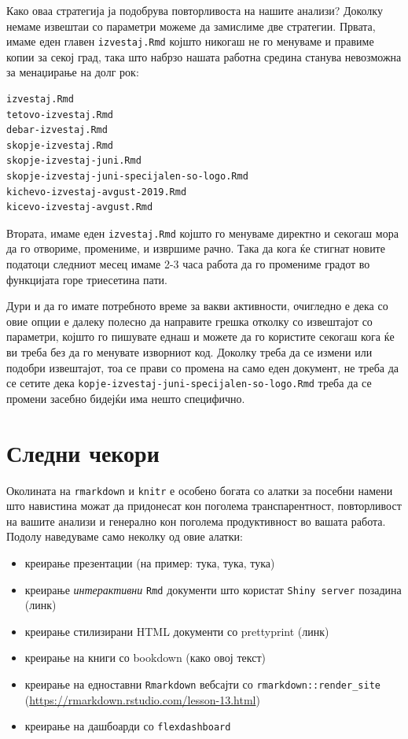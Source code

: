 \documentclass[
]{book}
\providecommand{\tightlist}{%
  \setlength{\itemsep}{0pt}\setlength{\parskip}{0pt}}
\begin{document}
Како оваа стратегија ја подобрува повторливоста на нашите анализи? Доколку немаме извештаи со параметри можеме да замислиме две стратегии. Првата, имаме еден главен \texttt{izvestaj.Rmd} којшто никогаш не го менуваме и правиме копии за секој град, така што набрзо нашата работна средина станува невозможна за менаџирање на долг рок:

\begin{verbatim}
izvestaj.Rmd
tetovo-izvestaj.Rmd
debar-izvestaj.Rmd
skopje-izvestaj.Rmd
skopje-izvestaj-juni.Rmd
skopje-izvestaj-juni-specijalen-so-logo.Rmd
kichevo-izvestaj-avgust-2019.Rmd
kicevo-izvestaj-avgust.Rmd
\end{verbatim}

Втората, имаме еден \texttt{izvestaj.Rmd} којшто го менуваме директно и секогаш мора да го отвориме, промениме, и извршиме рачно. Така да кога ќе стигнат новите податоци следниот месец имаме 2-3 часа работа да го промениме градот во функцијата горе триесетина пати.

Дури и да го имате потребното време за вакви активности, очигледно е дека со овие опции е далеку полесно да направите грешка отколку со извештајот со параметри, којшто го пишувате еднаш и можете да го користите секогаш кога ќе ви треба без да го менувате изворниот код. Доколку треба да се измени или подобри извештајот, тоа се прави со промена на само еден документ, не треба да се сетите дека \texttt{kopje-izvestaj-juni-specijalen-so-logo.Rmd} треба да се промени засебно бидејќи има нешто специфично.

\hypertarget{ux441ux43bux435ux434ux43dux438-ux447ux435ux43aux43eux440ux438}{%
\section{Следни чекори}\label{ux441ux43bux435ux434ux43dux438-ux447ux435ux43aux43eux440ux438}}

Околината на \texttt{rmarkdown} и \texttt{knitr} е особено богата со алатки за посебни намени што навистина можат да придонесат кон поголема транспарентност, повторливост на вашите анализи и генерално кон поголема продуктивност во вашата работа. Подолу наведуваме само неколку од овие алатки:

\begin{itemize}
\tightlist
\item
  креирање презентации (на пример: тука, тука, тука)
\item
  креирање \emph{интерактивни} \texttt{Rmd} документи што користат \texttt{Shiny\ server} позадина (линк)
\item
  креирање стилизирани HTML документи со prettyprint (линк)
\item
  креирање на книги со bookdown (како овој текст)
\item
  креирање на едноставни \texttt{Rmarkdown} вебсајти со \texttt{rmarkdown::render\_site} (\url{https://rmarkdown.rstudio.com/lesson-13.html})
\item
  креирање на дашбоарди со \texttt{flexdashboard}
\end{itemize}
\end{document}
